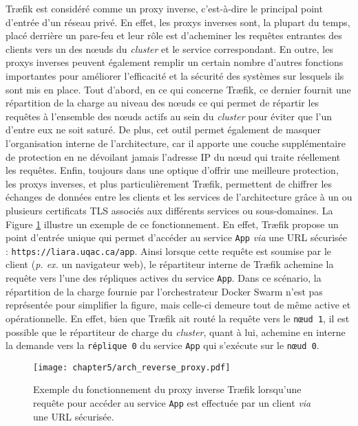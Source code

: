 Tr\ae{}fik est considéré comme un proxy inverse, c'est-à-dire le principal point d'entrée d'un réseau privé. En effet, les proxys inverses sont, la plupart du temps, placé derrière un pare-feu et leur rôle est d'acheminer les requêtes entrantes des clients vers un des n\oe{}uds du \textit{cluster} et le service correspondant. En outre, les proxys inverses peuvent également remplir un certain nombre d'autres fonctions importantes pour améliorer l'efficacité et la sécurité des systèmes sur lesquels ils sont mis en place. Tout d'abord, en ce qui concerne Tr\ae{}fik, ce dernier fournit une répartition de la charge au niveau des n\oe{}uds ce qui permet de répartir les requêtes à l'ensemble des n\oe{}uds actifs au sein du \textit{cluster} pour éviter que l'un d'entre eux ne soit saturé. De plus, cet outil permet également de masquer l'organisation interne de l'architecture, car il apporte une couche supplémentaire de protection en ne dévoilant jamais l'adresse IP du n\oe{}ud qui traite réellement les requêtes. Enfin, toujours dans une optique d'offrir une meilleure protection, les proxys inverses, et plus particulièrement Tr\ae{}fik, permettent de chiffrer les échanges de données entre les clients et les services de l'architecture grâce à un ou plusieurs certificats \acs{TLS} associés aux différents services ou sous-domaines. La Figure \ref{fig:arch_reverse_proxy} illustre un exemple de ce fonctionnement. En effet, Tr\ae{}fik propose un point d'entrée unique qui permet d'accéder au service \texttt{App} \textit{via} une \acs{URL} sécurisée : \texttt{https://liara.uqac.ca/app}. Ainsi lorsque cette requête est soumise par le client (\textit{p. ex. } un navigateur web), le répartiteur interne de Tr\ae{}fik achemine la requête vers l'une des répliques actives du service \texttt{App}. Dans ce scénario, la répartition de la charge fournie par l'orchestrateur Docker Swarm n'est pas représentée pour simplifier la figure, mais celle-ci demeure tout de même active et opérationnelle. En effet, bien que Tr\ae{}fik ait routé la requête vers le \texttt{n\oe{}ud 1}, il est possible que le répartiteur de charge du \textit{cluster}, quant à lui, achemine en interne la demande vers la \texttt{réplique 0} du service \texttt{App} qui s'exécute sur le \texttt{n\oe{}ud 0}.

\begin{figure}[H]
	\centering
	\texttt{[image: chapter5/arch\_reverse\_proxy.pdf]}
        \caption{Exemple du fonctionnement du proxy inverse Tr\ae{}fik lorsqu'une requête pour accéder au service \texttt{App} est effectuée par un client \textit{via} une \acs{URL} sécurisée.}
	\label{fig:arch_reverse_proxy}
\end{figure}

